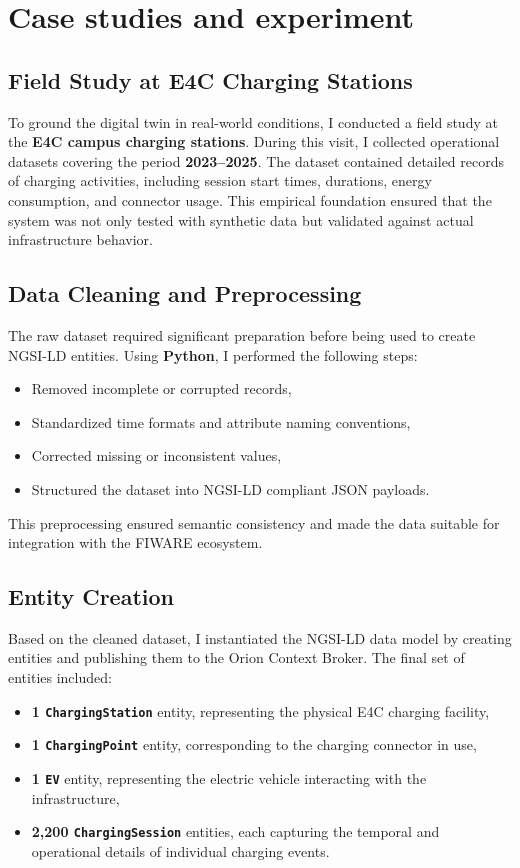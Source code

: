 \chapter{Case studies and experiment}\label{chap5}

\section{Field Study at E4C Charging Stations}
To ground the digital twin in real-world conditions, I conducted a field study at the \textbf{E4C campus charging stations}.  
During this visit, I collected operational datasets covering the period \textbf{2023–2025}.  
The dataset contained detailed records of charging activities, including session start times, durations, energy consumption, and connector usage.  
This empirical foundation ensured that the system was not only tested with synthetic data but validated against actual infrastructure behavior.

\section{Data Cleaning and Preprocessing}
The raw dataset required significant preparation before being used to create NGSI-LD entities.  
Using \textbf{Python}, I performed the following steps:
\begin{itemize}
    \item Removed incomplete or corrupted records,
    \item Standardized time formats and attribute naming conventions,
    \item Corrected missing or inconsistent values,
    \item Structured the dataset into NGSI-LD compliant JSON payloads.
\end{itemize}

This preprocessing ensured semantic consistency and made the data suitable for integration with the FIWARE ecosystem.

\section{Entity Creation}
Based on the cleaned dataset, I instantiated the NGSI-LD data model by creating entities and publishing them to the Orion Context Broker.  
The final set of entities included:
\begin{itemize}
    \item \textbf{1 \texttt{ChargingStation}} entity, representing the physical E4C charging facility,
    \item \textbf{1 \texttt{ChargingPoint}} entity, corresponding to the charging connector in use,
    \item \textbf{1 \texttt{EV}} entity, representing the electric vehicle interacting with the infrastructure,
    \item \textbf{2,200 \texttt{ChargingSession}} entities, each capturing the temporal and operational details of individual charging events.
\end{itemize}


